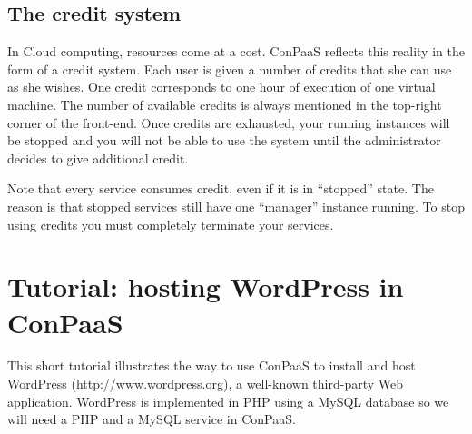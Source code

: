 \documentclass[10pt]{article}
\begin{document}
\subsection{The credit system}

In Cloud computing, resources come at a cost. ConPaaS reflects this
reality in the form of a credit system. Each user is given a number of
credits that she can use as she wishes. One credit corresponds to one
hour of execution of one virtual machine. The number of available
credits is always mentioned in the top-right corner of the front-end.
Once credits are exhausted, your running instances will be stopped and
you will not be able to use the system until the administrator decides
to give additional credit.

Note that every service consumes credit, even if it is in ``stopped''
state. The reason is that stopped services still have one ``manager''
instance running. To stop using credits you must completely terminate
your services.

\section{Tutorial: hosting WordPress in ConPaaS}

This short tutorial illustrates the way to use ConPaaS to install and
host WordPress (\url{http://www.wordpress.org}), a well-known third-party Web
application. WordPress is implemented in PHP using a MySQL database so
we will need a PHP and a MySQL service in ConPaaS.
\end{document}
